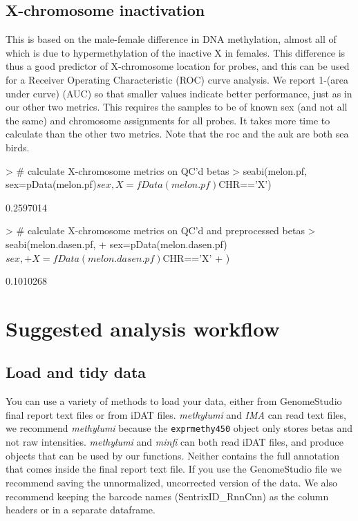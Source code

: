 \documentclass[11pt]{article}
\newcommand{\Robject}[1]{{\texttt{#1}}}
\newcommand{\Rpackage}[1]{{\textit{#1}}}
\begin{document}
\subsection{X-chromosome inactivation}
This is based on the male-female difference in DNA methylation, almost all of which is
due to hypermethylation of the inactive X in females. This difference is thus a good
predictor of X-chromosome location for probes, and this can be used for a Receiver 
Operating Characteristic (ROC) curve analysis.  We report 1-(area under curve) (AUC)
so that smaller values indicate better performance, just as in our other two metrics. This requires the samples
to be of known sex (and not all the same) and chromosome assignments for all probes. It
takes more time to calculate than the other two metrics. Note that the roc and 
the auk are both sea birds.


\begin{Schunk}
\begin{Sinput}
> # calculate X-chromosome metrics on QC'd betas
> seabi(melon.pf, sex=pData(melon.pf)$sex, X=fData(melon.pf)$CHR=='X')
\end{Sinput}
\begin{Soutput}
[1] 0.2597014
\end{Soutput}
\begin{Sinput}
> # calculate X-chromosome metrics on QC'd and preprocessed betas
> seabi(melon.dasen.pf, 
+    sex=pData(melon.dasen.pf)$sex, 
+    X=fData(melon.dasen.pf)$CHR=='X'
+ )
\end{Sinput}
\begin{Soutput}
[1] 0.1010268
\end{Soutput}
\end{Schunk}



\section{Suggested analysis workflow}
\subsection{Load and tidy data}
You can use a variety of methods to load your data,
either from GenomeStudio final report text files
or from iDAT files.  \Rpackage{methylumi} and
\Rpackage{IMA} can read text files, we recommend 
\Rpackage{methylumi} because the \Robject{exprmethy450}
object only stores betas and not raw intensities.
\Rpackage{methylumi} and \Rpackage{minfi} can both read 
iDAT files, and produce objects that can be used by 
our functions.  Neither contains the full annotation
that comes inside the final report text file.  If you 
use the GenomeStudio file we recommend saving the 
unnormalized, uncorrected version of the data. We
also recommend keeping the barcode names 
(SentrixID\_RnnCnn) as the column headers or in a separate
dataframe.
\end{document}
